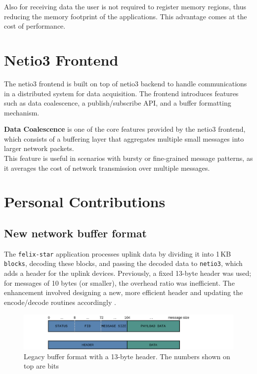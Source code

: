 Also for receiving data the user is not required to register memory regions, thus reducing the memory footprint of the applications. This advantage comes at the cost of performance.\\

\section{Netio3 Frontend}

The netio3 frontend is built on top of netio3 backend to handle communications in a distributed system for data acquisition. The frontend introduces features such as data coalescence, a publish/subscribe \acs{API}, and a buffer formatting mechanism.

\textbf{Data Coalescence} is one of the core features provided by the netio3 frontend, which consists of a buffering layer that aggregates multiple small messages into larger network packets.\\
This feature is useful in scenarios with bursty or fine-grained message patterns, as it averages the cost of network transmission over multiple messages.

\clearpage
\section{Personal Contributions}

\subsection{New network buffer format}

The \texttt{felix-star} application processes uplink data by dividing it into 1\,KB \texttt{blocks}, decoding these blocks, and passing the decoded data to \texttt{netio3}, which adds a header for the uplink devices. 
Previously, a fixed 13-byte header was used; for messages of 10 bytes (or smaller), the overhead ratio was inefficient.
The enhancement involved designing a new, more efficient header and updating the encode/decode routines accordingly \cite{netio3-header-commit}.\\

\begin{figure}[htbp]
\centering
\includegraphics[width=\textwidth]{images/contributions/old-buffer-format.png}
\caption[Legacy format of network buffer]{Legacy buffer format with a 13-byte header. The numbers shown on top are bits}
\label{fig:old-buffer-format}
\end{figure}

